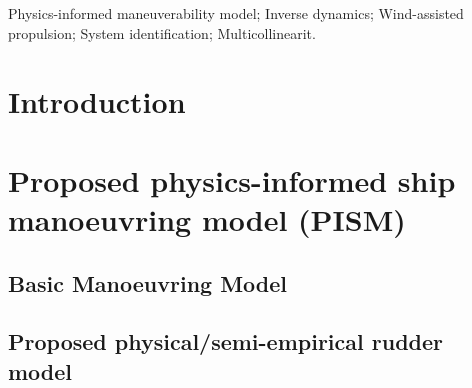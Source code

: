 \documentclass[preprint,12pt,authoryear]{elsarticle}
\begin{document}
\begin{frontmatter}

    \begin{abstract}
        

    \end{abstract}


    \begin{keyword}
    Physics-informed maneuverability model; Inverse dynamics; Wind-assisted propulsion; System identification;  Multicollinearit.



    \end{keyword}

\end{frontmatter}


\section{Introduction}
\label{sec:introduction}

%
%
%
\section{Proposed physics-informed ship manoeuvring model (PISM)}
\label{sec:ship_models}

\FloatBarrier
\subsection{Basic Manoeuvring Model}
\label{sec:models}

%
\subsection{Proposed physical/semi-empirical rudder model}
\label{sec:semiempirical_rudder_model}

\end{document}
